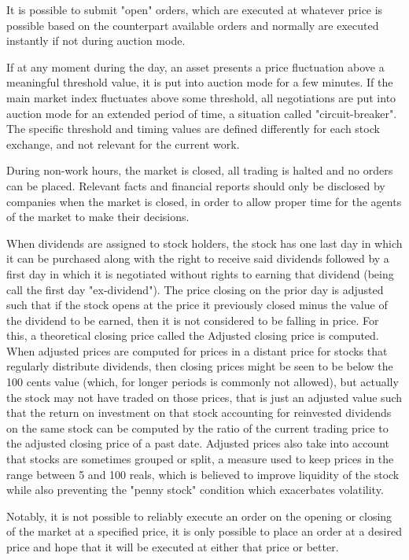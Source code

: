 \documentclass[conference]{IEEEtran}
\begin{document}
It is possible to submit "open" orders, which are executed at whatever price is possible based on the counterpart available orders and normally are executed instantly if not during auction mode.

If at any moment during the day, an asset presents a price fluctuation above a meaningful threshold value, it is put into auction mode for a few minutes. If the main market index fluctuates above some threshold, all negotiations are put into auction mode for an extended period of time, a situation called "circuit-breaker". The specific threshold and timing values are defined differently for each stock exchange, and not relevant for the current work.

During non-work hours, the market is closed, all trading is halted and no orders can be placed. Relevant facts and financial reports should only be disclosed by companies when the market is closed, in order to allow proper time for the agents of the market to make their decisions.

When dividends are assigned to stock holders, the stock has one last day in which it can be purchased along with the right to receive said dividends followed by a first day in which it is negotiated without rights to earning that dividend (being call the first day "ex-dividend"). The price closing on the prior day is adjusted such that if the stock opens at the price it previously closed minus the value of the dividend to be earned, then it is not considered to be falling in price. For this, a theoretical closing price called the Adjusted closing price is computed. When adjusted prices are computed for prices in a distant price for stocks that regularly distribute dividends, then closing prices might be seen to be below the 100 cents value (which, for longer periods is commonly not allowed), but actually the stock may not have traded on those prices, that is just an adjusted value such that the return on investment on that stock accounting for reinvested dividends on the same stock can be computed by the ratio of the current trading price to the adjusted closing price of a past date. Adjusted prices also take into account that stocks are sometimes grouped or split, a measure used to keep prices in the range between 5 and 100 reals, which is believed to improve liquidity of the stock while also preventing the "penny stock" condition which exacerbates volatility.

Notably, it is not possible to reliably execute an order on the opening or closing of the market at a specified price, it is only possible to place an order at a desired price and hope that it will be executed at either that price or better. 
\end{document}
